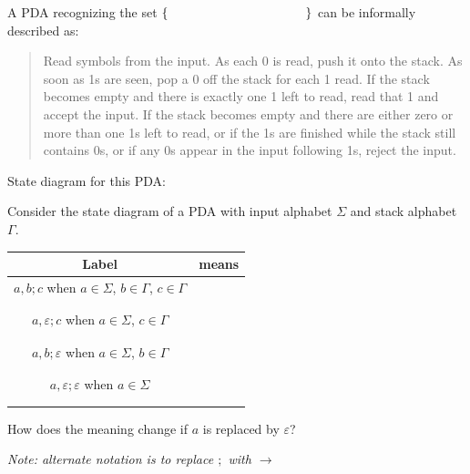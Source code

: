 \documentclass[12pt, oneside]{article}
\begin{document}
\vspace{60pt}
    
A PDA recognizing the set $\{ \hspace{1.5 in} \}$ can be informally described as:
\begin{quote}
    Read symbols from the input. As each 0 is read, push it onto the stack. As soon as 1s are seen, pop a 0 off the stack for each 1 read. If the stack becomes empty and there is exactly one 1 left to read, read that 1 and accept the input. If the stack becomes empty and there are either zero or more than one 1s left to read, or if the 1s are finished while the stack still contains 0s, or if any 0s appear in the input following 1s, reject the input.
\end{quote}
    
    State diagram for this  PDA:

    
\vfill
\newpage
Consider the state diagram of a PDA with input alphabet 
$\Sigma$ and stack alphabet $\Gamma$.

\begin{center}
\begin{tabular}{|c|c|}
\hline
Label & means \\
\hline
$a, b ; c$ when $a \in \Sigma$, $b\in \Gamma$, $c \in \Gamma$ 
& \hspace{3in} \\
& \\
&\\
\hline
$a, \varepsilon ; c$ when $a \in \Sigma$, $c \in \Gamma$ 
& \hspace{3in} \\
& \\
&\\
\hline
$a, b ; \varepsilon$ when $a \in \Sigma$, $b\in \Gamma$
& \hspace{3in} \\
& \\
&\\
\hline
$a, \varepsilon ; \varepsilon$ when $a \in \Sigma$
& \hspace{3in} \\
& \\
&\\
\hline
\end{tabular}
\end{center}


How does the meaning change if $a$ is replaced by $\varepsilon$?

{\it Note: alternate notation is to replace $;$ with $\to$}
\end{document}
